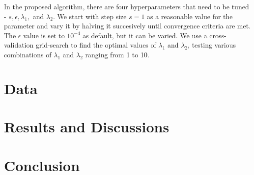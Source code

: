 In the proposed algorithm, there are four hyperparameters that need to be tuned - $s, \epsilon,\lambda_1,$ and $\lambda_2$. We start with step size $s=1$ as a reasonable value for the parameter and vary it by halving it succesively until convergence criteria are met. The $\epsilon$ value is set to $10^{-4}$ as default, but it can be varied. We use a cross-validation grid-search to find the optimal values of $\lambda_1$ and $\lambda_2$, testing various combinations of $\lambda_1$ and $\lambda_2$ ranging from 1 to 10. \\ 

\section{Data}

\section{Results and Discussions}

\section{Conclusion}